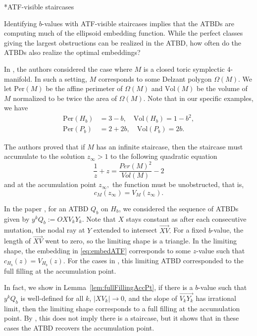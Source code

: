 \documentclass[11pt, reqno]{amsart}
\makeatletter
\def\subsubsection{\@startsection{subsubsection}{3}%
  \z@{.5\linespacing\@plus.7\linespacing}{-.5em}%
  {\normalfont\bfseries}}
\theoremstyle{remark}
\numberwithin{equation}{subsection}
\numberwithin{figure}{section}
\theoremstyle{customremark}
\newcommand{\ovr}{\overrightarrow}
\makeatother
\begin{document}
\subsubsection*{ATF-visible staircases}




Identifying $b$-values with ATF-visible staircases implies that the ATBDs are computing much of the ellipsoid embedding function. While the perfect classes giving the largest obstructions can be realized in the ATBD, how often do the ATBDs also realize the optimal embeddings? 

In \cite{AADT}, the authors considered the case where $M$ is a closed toric symplectic $4$-manifold. In such a setting, $M$ corresponds to some Delzant polygon $\Omega(M).$ We let $\text{Per}(M)$ be the affine perimeter of $\Omega(M)$ and $\text{Vol}(M)$ be the volume of $M$ normalized to be twice the area of $\Omega(M).$ Note that in our specific examples, we have
\begin{align*} \text{Per}(H_b)&=3-b, \quad \text{Vol}(H_b)=1-b^2, \\
\text{Per}(P_b)&=2+2b, \quad \text{Vol}(P_b)=2b.
\end{align*}
  
  The authors proved \cite[Theorem 1.13]{AADT} that if $M$ has an infinite staircase, then the staircase must accumulate to the solution $z_\infty>1$ to the following quadratic equation
  \begin{equation} \label{eq:accPt}
       \frac{1}{z}+z=\frac{Per(M)^2}{Vol(M)}-2
\end{equation}
and at the accumulation point $z_\infty,$ the function must be unobstructed, that is, \[c_M(z_\infty)=V_M(z_\infty).\]

In the paper \cite{M1}, for an ATBD $Q_b$ on $H_b$, we considered the sequence of ATBDs given by $y^kQ_b:=OXV_kY_k$. Note that $X$ stays constant as after each consecutive mutation, the nodal ray at $Y$ extended to intersect $\ovr{XV}.$ For a fixed $b$-value, the length of $\ovr{XV}$ went to zero, so the limiting shape is a triangle. In the limiting shape, the embedding in \eqref{eq:embedATF} corresponds to some $z$-value such that $c_{H_b}(z)=V_{H_b}(z).$ For the cases in \cite{M1}, this limiting ATBD corresponded to the full filling at the accumulation point. 

In fact, we show in Lemma~\ref{lem:fullFillingAccPt}, if there is a $b$-value such that  \(y^kQ_b\) is well-defined for all \(k\), \(|XV_k|\to0\), and the slope of $\ovr{V_kY_k}$ has irrational limit, then the limiting shape corresponds to a full filling at the accumulation point. By \cite{AADT}, this does not imply there is a staircase, but it shows that in these cases the ATBD recovers the accumulation point. 
\end{document}
